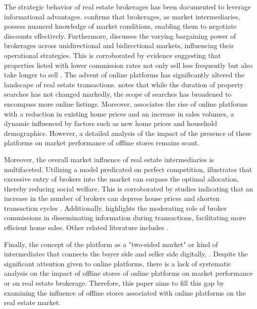 \documentclass[11pt]{article}
\begin{document}
The strategic behavior of real estate brokerages has been documented to leverage informational advantages. \citet{AGARWAL2019715} confirms that brokerages, as market intermediaries, possess nuanced knowledge of market conditions, enabling them to negotiate discounts effectively. Furthermore, \citet{HAN2015813} discusses the varying bargaining power of brokerages across unidirectional and bidirectional markets, influencing their operational strategies. This is corroborated by evidence suggesting that properties listed with lower commission rates not only sell less frequently but also take longer to sell \citep{10.1257/app.20160214}. The advent of online platforms has significantly altered the landscape of real estate transactions. \citet{ZUMPANO2003134} notes that while the duration of property searches has not changed markedly, the scope of searches has broadened to encompass more online listings. Moreover, \citet{ZHANG2021101104} associates the rise of online platforms with a reduction in existing home prices and an increase in sales volumes, a dynamic influenced by factors such as new home prices and household demographics. However, a detailed analysis of the impact of the presence of these platforms on market performance of offline stores remains scant.

Moreover, the overall market influence of real estate intermediaries is multifaceted. Utilizing a model predicated on perfect competition, \citet{williams_agency_1998} illustrates that excessive entry of brokers into the market can surpass the optimal allocation, thereby reducing social welfare. This is corroborated by studies indicating that an increase in the number of brokers can depress house prices and shorten transaction cycles \citep{https://doi.org/10.1002/jae.2891}. Additionally, \citet{qu_identifying_2021} highlights the moderating role of broker commissions in disseminating information during transactions, facilitating more efficient home sales. Other related literature includes \citep{doi:10.1080/10527001.2021.2016340, doi:10.1080/10835547.1996.12090852}.

Finally, the concept of the platform as a "two-sided market" or kind of intermediates that connects the buyer side and seller side digitally, \citep{10.1162/154247603322493212, Langley_Leyshon_2017}. Despite the significant attention given to online platforms, there is a lack of systematic analysis on the impact of offline stores of online platforms on market performance or on real estate brokerage. Therefore, this paper aims to fill this gap by examining the influence of offline stores associated with online platforms on the real estate market.
\end{document}
